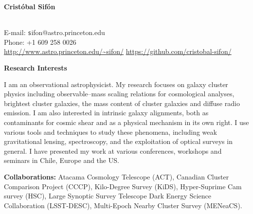 \documentclass[11pt]{article}
\newcommand\technical[2]{
  \noindent
    {\large\bf #1:} #2\\
  }
\newcommand\sectitle[1]{
  \vspace{0.5cm}
  \noindent
  \textbf{\large #1}\\
  \vspace{-0.2cm}
}
\begin{document}
\begin{minipage}[b]{0.46\linewidth}
\flushleft
\hspace{-0.7cm}
{\bf\huge Crist\'obal Sif\'on}\\\vspace{0.2cm}
\\
\end{minipage}
\begin{minipage}[b]{0.49\linewidth}
\flushright
{\large E-mail: {\texttt sifon@astro.princeton.edu}\\
        Phone: +1 609 258 0026\\
        \url{http://www.astro.princeton.edu/~sifon/}
        \url{https://github.com/cristobal-sifon/}}
\end{minipage}
\vspace{0.4cm}
\hline


\sectitle{Research Interests}

I am an observational astrophysicist. My research focuses on galaxy 
cluster physics including observable--mass scaling relations for cosmological 
analyses, brightest cluster galaxies, the mass content of cluster galaxies and 
diffuse radio emission. I am also interested in intrinsic galaxy alignments, both 
as contaminants for cosmic shear and as a physical mechanism in its own right. I 
use various tools and techniques to study these phenomena, including weak 
gravitational lensing, spectroscopy, and the exploitation of optical surveys in 
general. I have presented my work at various conferences, workshops and seminars 
in Chile, Europe and the US.

\vspace{0.5cm}
\technical{Collaborations}
{Atacama Cosmology Telescope (ACT), Canadian Cluster Comparison Project (CCCP), 
Kilo-Degree Survey (KiDS), Hyper-Suprime Cam survey (HSC), Large Synoptic Survey Telescope Dark Energy Science Collaboration (LSST-DESC),
Multi-Epoch Nearby Cluster Survey (MENeaCS).}
\end{document}
